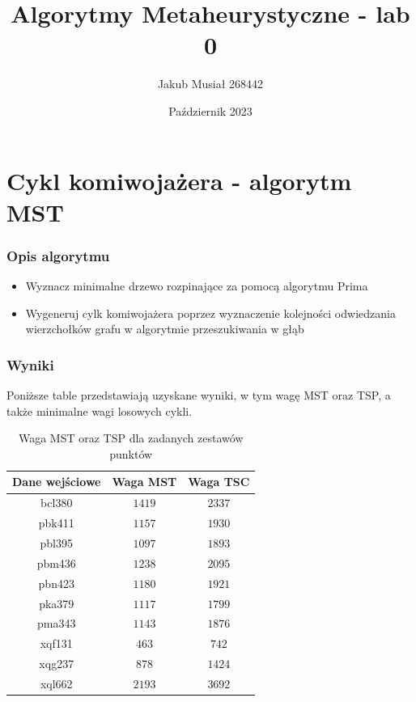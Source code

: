 \documentclass[12pt]{article}
\title{Algorytmy Metaheurystyczne - lab 0}
\author{Jakub Musiał 268442}
\date{Październik 2023}
\begin{document}
\maketitle

\hspace{1cm}

\section*{Cykl komiwojażera - algorytm MST}

\subsubsection*{Opis algorytmu}
    \begin{itemize}
        \item Wyznacz minimalne drzewo rozpinające za pomocą algorytmu Prima
        \item Wygeneruj cylk komiwojażera poprzez wyznaczenie kolejności odwiedzania
              wierzchołków grafu w algorytmie przeszukiwania w głąb
    \end{itemize}

    \noindent \newline

\subsubsection*{Wyniki}
    Poniższe table przedstawiają uzyskane wyniki, w tym wagę MST oraz TSP,
    a także minimalne wagi losowych cykli.

    \begin{table}[h!]
        \centering
        \begin{tabularx}{0.4935\textwidth}{| c | c | c |}
            \hline
            Dane wejściowe & Waga MST & Waga TSC \\
            \hline
            bcl380 & $1419$ & $2337$ \\
            pbk411 & $1157$ & $1930$ \\
            pbl395 & $1097$ & $1893$ \\
            pbm436 & $1238$ & $2095$ \\
            pbn423 & $1180$ & $1921$ \\
            pka379 & $1117$ & $1799$ \\
            pma343 & $1143$ & $1876$ \\
            xqf131 & $463$  & $742$  \\
            xqg237 & $878$  & $1424$ \\
            xql662 & $2193$ & $3692$ \\
            \hline
        \end{tabularx}
        \caption{Waga MST oraz TSP dla zadanych zestawów punktów}
        \label{table:weights}
    \end{table}
\end{document}
